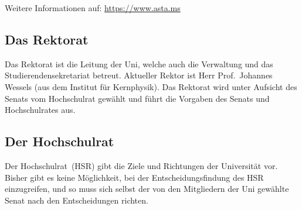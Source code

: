 \begin{multicols*}{2}
\begin{center}
{\begin{minipage}{0.95\columnwidth}
		\medskip
		\small
		Weitere Informationen auf: \url{https://www.asta.ms}
	\end{minipage}
	}
\end{center}

\subsection{Das Rektorat}
Das Rektorat ist die Leitung der Uni, welche auch die Verwaltung und das Studierendensekretariat betreut.
Aktueller Rektor ist Herr Prof.\ Johannes Wessels (aus dem Institut für Kernphysik).
Das Rektorat wird unter Aufsicht des Senats vom Hochschulrat gewählt und führt die Vorgaben des Senats und Hochschulrates aus.

\subsection{Der Hochschulrat}
Der Hochschulrat~(HSR) gibt die Ziele und Richtungen der Universität vor.
Bisher gibt es keine Möglichkeit, bei der Entscheidungsfindung des HSR einzugreifen, und so muss sich selbst der von den Mitgliedern der Uni gewählte Senat nach den Entscheidungen richten.

\end{multicols*}

